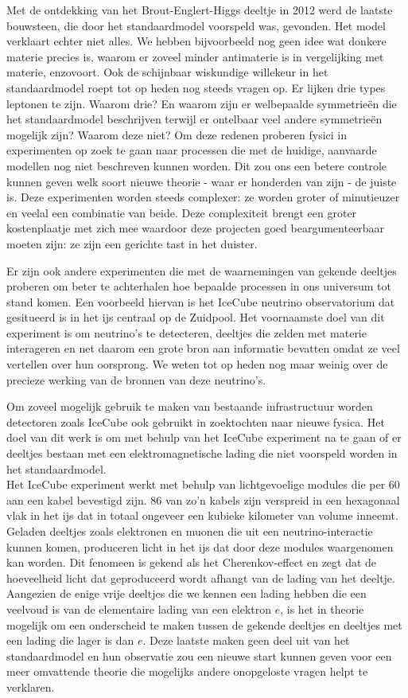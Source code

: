 \noindent Met de ontdekking van het Brout-Englert-Higgs deeltje in 2012 werd de laatste bouwsteen, die door het standaardmodel voorspeld was, gevonden. Het model verklaart echter niet alles. We hebben bijvoorbeeld nog geen idee wat donkere materie precies is, waarom er zoveel minder antimaterie is in vergelijking met materie, enzovoort. Ook de schijnbaar wiskundige willekeur in het standaardmodel roept tot op heden nog steeds vragen op. Er lijken drie types leptonen te zijn. Waarom drie? En waarom zijn er welbepaalde symmetrie\"en die het standaardmodel beschrijven terwijl er ontelbaar veel andere symmetrie\"en mogelijk zijn? Waarom deze niet? Om deze redenen proberen fysici in experimenten op zoek te gaan naar processen die met de huidige, aanvaarde modellen nog niet beschreven kunnen worden. Dit zou ons een betere controle kunnen geven welk soort nieuwe theorie - waar er honderden van zijn - de juiste is. Deze experimenten worden steeds complexer: ze worden groter of minutieuzer en veelal een combinatie van beide. Deze complexiteit brengt een groter kostenplaatje met zich mee waardoor deze projecten goed beargumenteerbaar moeten zijn: ze zijn een gerichte tast in het duister.

Er zijn ook andere experimenten die met de waarnemingen van gekende deeltjes proberen om beter te achterhalen hoe bepaalde processen in ons universum tot stand komen. Een voorbeeld hiervan is het IceCube neutrino observatorium dat gesitueerd is in het ijs centraal op de Zuidpool. Het voornaamste doel van dit experiment is om neutrino's te detecteren, deeltjes die zelden met materie interageren en net daarom een grote bron aan informatie bevatten omdat ze veel vertellen over hun oorsprong. We weten tot op heden nog maar weinig over de precieze werking van de bronnen van deze neutrino's.

Om zoveel mogelijk gebruik te maken van bestaande infrastructuur worden detectoren zoals IceCube ook gebruikt in zoektochten naar nieuwe fysica. Het doel van dit werk is om met behulp van het IceCube experiment na te gaan of er deeltjes bestaan met een elektromagnetische lading die niet voorspeld worden in het standaardmodel.\\

\noindent Het IceCube experiment werkt met behulp van lichtgevoelige modules die per 60 aan een kabel bevestigd zijn. 86 van zo'n kabels zijn verspreid in een hexagonaal vlak in het ijs dat in totaal ongeveer een kubieke kilometer van volume inneemt. Geladen deeltjes zoals elektronen en muonen die uit een neutrino-interactie kunnen komen, produceren licht in het ijs dat door deze modules waargenomen kan worden. Dit fenomeen is gekend als het Cherenkov-effect en zegt dat de hoeveelheid licht dat geproduceerd wordt afhangt van de lading van het deeltje. Aangezien de enige vrije deeltjes die we kennen een lading hebben die een veelvoud is van de elementaire lading van een elektron $e$, is het in theorie mogelijk om een onderscheid te maken tussen de gekende deeltjes en deeltjes met een lading die lager is dan $e$. Deze laatste maken geen deel uit van het standaardmodel en hun observatie zou een nieuwe start kunnen geven voor een meer omvattende theorie die mogelijks andere onopgeloste vragen helpt te verklaren.\\

